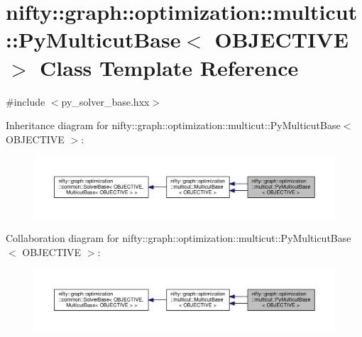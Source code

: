 \hypertarget{classnifty_1_1graph_1_1optimization_1_1multicut_1_1PyMulticutBase}{}\section{nifty\+:\+:graph\+:\+:optimization\+:\+:multicut\+:\+:Py\+Multicut\+Base$<$ O\+B\+J\+E\+C\+T\+I\+V\+E $>$ Class Template Reference}
\label{classnifty_1_1graph_1_1optimization_1_1multicut_1_1PyMulticutBase}


{\ttfamily \#include $<$py\+\_\+solver\+\_\+base.\+hxx$>$}



Inheritance diagram for nifty\+:\+:graph\+:\+:optimization\+:\+:multicut\+:\+:Py\+Multicut\+Base$<$ O\+B\+J\+E\+C\+T\+I\+V\+E $>$\+:\nopagebreak
\begin{figure}[H]
\begin{center}
\leavevmode
\includegraphics[width=350pt]{classnifty_1_1graph_1_1optimization_1_1multicut_1_1PyMulticutBase__inherit__graph}
\end{center}
\end{figure}


Collaboration diagram for nifty\+:\+:graph\+:\+:optimization\+:\+:multicut\+:\+:Py\+Multicut\+Base$<$ O\+B\+J\+E\+C\+T\+I\+V\+E $>$\+:\nopagebreak
\begin{figure}[H]
\begin{center}
\leavevmode
\includegraphics[width=350pt]{classnifty_1_1graph_1_1optimization_1_1multicut_1_1PyMulticutBase__coll__graph}
\end{center}
\end{figure}
